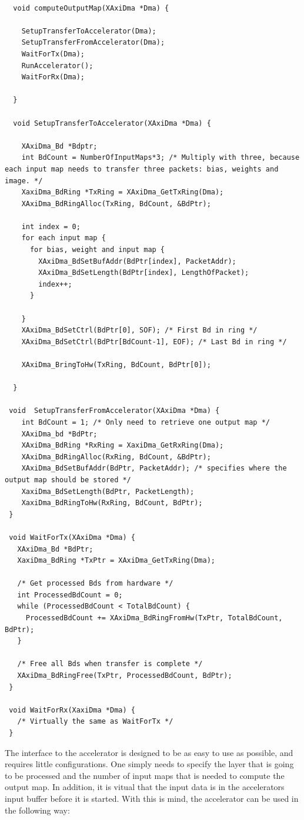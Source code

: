 \begin{lstlisting}

  void computeOutputMap(XAxiDma *Dma) {

    SetupTransferToAccelerator(Dma);
    SetupTransferFromAccelerator(Dma);
    WaitForTx(Dma);
    RunAccelerator();
    WaitForRx(Dma);
    
  }

  void SetupTransferToAccelerator(XAxiDma *Dma) {

    XAxiDma_Bd *Bdptr;
    int BdCount = NumberOfInputMaps*3; /* Multiply with three, because each input map needs to transfer three packets: bias, weights and image. */
    XaxiDma_BdRing *TxRing = XAxiDma_GetTxRing(Dma);
    XAxiDma_BdRingAlloc(TxRing, BdCount, &BdPtr); 

    int index = 0;
    for each input map {
      for bias, weight and input map {
        XAxiDma_BdSetBufAddr(BdPtr[index], PacketAddr);
        XAxiDma_BdSetLength(BdPtr[index], LengthOfPacket);
        index++;
      }
      
    }
    XAxiDma_BdSetCtrl(BdPtr[0], SOF); /* First Bd in ring */
    XAxiDma_BdSetCtrl(BdPtr[BdCount-1], EOF); /* Last Bd in ring */

    XAxiDma_BringToHw(TxRing, BdCount, BdPtr[0]);
    
  }

 void  SetupTransferFromAccelerator(XAxiDma *Dma) {
    int BdCount = 1; /* Only need to retrieve one output map */
    XAxiDma_bd *BdPtr;
    XAxiDma_BdRing *RxRing = XaxiDma_GetRxRing(Dma);
    XAxiDma_BdRingAlloc(RxRing, BdCount, &BdPtr);
    XAxiDma_BdSetBufAddr(BdPtr, PacketAddr); /* specifies where the output map should be stored */
    XaxiDma_BdSetLength(BdPtr, PacketLength);
    XaxiDma_BdRingToHw(RxRing, BdCount, BdPtr);
 }

 void WaitForTx(XAxiDma *Dma) {
   XAxiDma_Bd *BdPtr;
   XaxiDma_BdRing *TxPtr = XAxiDma_GetTxRing(Dma);

   /* Get processed Bds from hardware */
   int ProcessedBdCount = 0;
   while (ProcessedBdCount < TotalBdCount) {
     ProcessedBdCount += XAxiDma_BdRingFromHw(TxPtr, TotalBdCount, BdPtr);
   }

   /* Free all Bds when transfer is complete */
   XAxiDma_BdRingFree(TxPtr, ProcessedBdCount, BdPtr);
 }

 void WaitForRx(XaxiDma *Dma) {
   /* Virtually the same as WaitForTx */
 }
\end{lstlisting}

The interface to the accelerator is designed to be as easy to use as possible, and requires little configurations. One simply needs to specify the layer that is going to be processed and the number of input maps that is needed to compute the output map. In addition, it is vitual that the input data is in the accelerators input buffer before it is started. With this is mind, the accelerator can be used in the following way:

